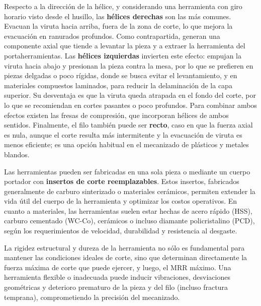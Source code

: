 Respecto a la dirección de la hélice, y considerando una herramienta con giro horario visto desde el husillo, las \textbf{hélices derechas} son las más comunes. Evacuan la viruta hacia arriba, fuera de la zona de corte, lo que mejora la evacuación en ranurados profundos. Como contrapartida, generan una componente axial que tiende a levantar la pieza y a extraer la herramienta del portaherramientas. Las \textbf{hélices izquierdas} invierten este efecto: empujan la viruta hacia abajo y presionan la pieza contra la mesa, por lo que se prefieren en piezas delgadas o poco rígidas, donde se busca evitar el levantamiento, y en materiales compuestos laminados, para reducir la delaminación de la capa superior. Su desventaja es que la viruta queda atrapada en el fondo del corte, por lo que se recomiendan en cortes pasantes o poco profundos. Para combinar ambos efectos existen las fresas de compresión, que incorporan hélices de ambos sentidos. Finalmente, el filo también puede ser \textbf{recto}, caso en que la fuerza axial es nula, aunque el corte resulta más intermitente y la evacuación de viruta es menos eficiente; es una opción habitual en el mecanizado de plásticos y metales blandos.

Las herramientas pueden ser fabricadas en una sola pieza o mediante un cuerpo portador con \textbf{insertos de corte reemplazables}. Estos insertos, fabricados generalmente de carburo sinterizado o materiales cerámicos, permiten extender la vida útil del cuerpo de la herramienta y optimizar los costos operativos. En cuanto a materiales, las herramientas suelen estar hechas de acero rápido (HSS), carburo cementado (WC-Co), cerámicos o incluso diamante policristalino (PCD), según los requerimientos de velocidad, durabilidad y resistencia al desgaste.

La rigidez estructural y dureza de la herramienta no sólo es fundamental para mantener las condiciones ideales de corte, sino que determinan directamente la fuerza máxima de corte que puede ejercer, y luego, el MRR máximo. Una herramienta flexible o inadecuada puede inducir vibraciones, desviaciones geométricas y deterioro prematuro de la pieza y del filo (incluso fractura temprana), comprometiendo la precisión del mecanizado.

